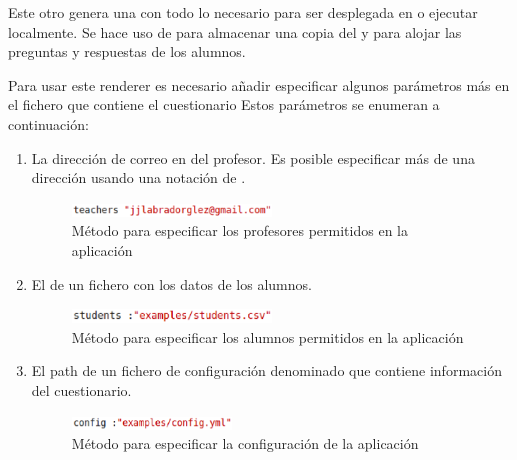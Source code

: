 

Este otro  genera una   con todo lo necesario para ser desplegada en  o ejecutar localmente. 
Se hace uso de  para almacenar una copia del  y para alojar las preguntas y respuestas de los alumnos.

Para usar este renderer es necesario a\~{n}adir especificar algunos par\'ametros m\'as en el fichero  que contiene el cuestionario
Estos par\'ametros se enumeran a continuaci\'on:

\begin{enumerate}
  \item La direcci\'on de correo en  del profesor. Es posible especificar m\'as de una direcci\'on usando una notaci\'on
  de .
  \begin{figure}[!th]
  \begin{center}
  \includegraphics[width=0.5\textwidth]{images/teachers.eps}
  \caption{M\'etodo para especificar los profesores permitidos en la aplicaci\'on}
  \label{fig:teachers}
  \end{center}
  \end{figure}
  
  \item El  de un fichero \ceis{\ref{apend1:csv}} con los datos de los alumnos.
  \begin{figure}[!th]
  \begin{center}
  \includegraphics[width=0.5\textwidth]{images/students.eps}
  \caption{M\'etodo para especificar los alumnos permitidos en la aplicaci\'on}
  \label{fig:students}
  \end{center}
  \end{figure}
  \newpage
  
  \item El path de un fichero de configuraci\'on denominado  que contiene informaci\'on del cuestionario.
  \begin{figure}[!th]
  \begin{center}
  \includegraphics[width=0.4\textwidth]{images/config.eps}
  \caption{M\'etodo para especificar la configuraci\'on de la aplicaci\'on}
  \label{fig:config}
  \end{center}
  \end{figure}
  
\end{enumerate}

